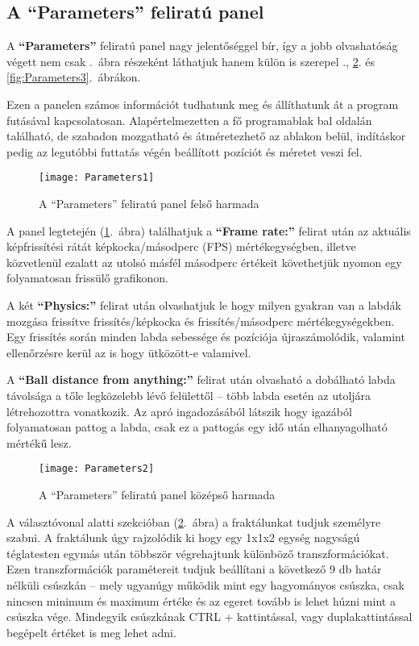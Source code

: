 \subsection{A ``Parameters'' feliratú panel}

A \textbf{``Parameters''} feliratú panel nagy jelentőséggel bír, így a jobb olvashatóság végett nem csak .~ábra részeként láthatjuk hanem külön is szerepel ., \ref{fig:Parameters2}. és \ref{fig:Parameters3}.~ábrákon.

Ezen a panelen számos információt tudhatunk meg és állíthatunk át a program futásával kapcsolatosan. Alapértelmezetten a fő programablak bal oldalán található, de szabadon mozgatható és átméretezhető az ablakon belül, indításkor pedig az legutóbbi futtatás végén beállított pozíciót és méretet veszi fel. 

\begin{figure}[H]
	\centering
	\texttt{[image: Parameters1]}
	\caption{A ``Parameters'' feliratú panel felső harmada}
	\label{fig:Parameters1}
\end{figure}

A panel legtetején (\ref{fig:Parameters1}.~ábra) találhatjuk a \textbf{``Frame rate:''} felirat után az aktuális képfrissítési rátát képkocka/másodperc (FPS) mértékegységben, illetve közvetlenül ezalatt az utolsó másfél másodperc értékeit követhetjük nyomon egy folyamatosan frissülő grafikonon. 

A két \textbf{``Physics:''} felirat után olvashatjuk le hogy milyen gyakran van a labdák mozgása frissítve frissítés/képkocka és frissítés/másodperc mértékegységekben. Egy frissítés során minden labda sebessége és pozíciója újraszámolódik, valamint ellenőrzésre kerül az is hogy ütközött-e valamivel. 

A \textbf{``Ball distance from anything:''} felirat után olvasható a dobálható labda távolsága a tőle legközelebb lévő felülettől -- több labda esetén az utoljára létrehozottra vonatkozik. Az apró ingadozásából látszik hogy igazából folyamatosan pattog a labda, csak ez a pattogás egy idő után elhanyagolható mértékű lesz.

\begin{figure}[H]
	\centering
	\texttt{[image: Parameters2]}
	\caption{A ``Parameters'' feliratú panel középső harmada}
	\label{fig:Parameters2}
\end{figure}

A választóvonal alatti szekcióban (\ref{fig:Parameters2}.~ábra) a fraktálunkat tudjuk személyre szabni. A fraktálunk úgy rajzolódik ki hogy egy 1x1x2 egység nagyságú téglatesten egymás után többször végrehajtunk különböző transzformációkat. Ezen transzformációk paramétereit tudjuk beállítani a következő 9 db határ nélküli csúszkán -- mely ugyanúgy működik mint egy hagyományos csúszka, csak nincsen minimum és maximum értéke és az egeret tovább is lehet húzni mint a csúszka vége. Mindegyik csúszkának CTRL + kattintással, vagy duplakattintással begépelt értéket is meg lehet adni. 

